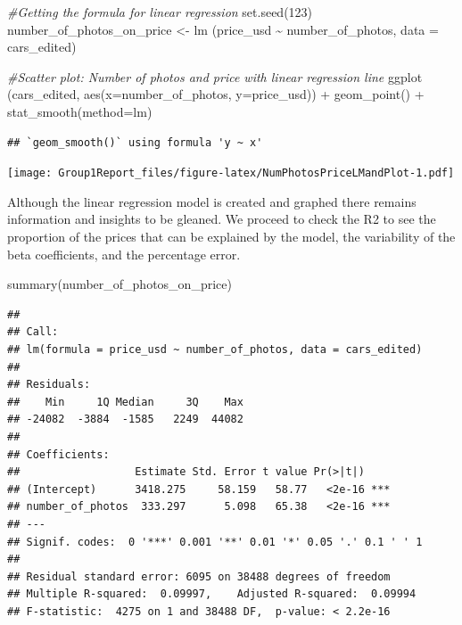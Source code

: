 \documentclass[
]{article}
\newenvironment{Shaded}{\begin{snugshade}}{\end{snugshade}}
\newcommand{\AttributeTok}[1]{\textcolor[rgb]{0.77,0.63,0.00}{#1}}
\newcommand{\CommentTok}[1]{\textcolor[rgb]{0.56,0.35,0.01}{\textit{#1}}}
\newcommand{\DecValTok}[1]{\textcolor[rgb]{0.00,0.00,0.81}{#1}}
\newcommand{\FunctionTok}[1]{\textcolor[rgb]{0.00,0.00,0.00}{#1}}
\newcommand{\NormalTok}[1]{#1}
\newcommand{\OtherTok}[1]{\textcolor[rgb]{0.56,0.35,0.01}{#1}}
\newcommand{\SpecialCharTok}[1]{\textcolor[rgb]{0.00,0.00,0.00}{#1}}
\begin{document}
\begin{Shaded}
\begin{Highlighting}[]
\CommentTok{\#Getting the formula for linear regression}
\FunctionTok{set.seed}\NormalTok{(}\DecValTok{123}\NormalTok{)}
\NormalTok{number\_of\_photos\_on\_price }\OtherTok{\textless{}{-}} \FunctionTok{lm}\NormalTok{ (price\_usd }\SpecialCharTok{\textasciitilde{}}\NormalTok{ number\_of\_photos, }\AttributeTok{data =}\NormalTok{ cars\_edited)}

\CommentTok{\#Scatter plot: Number of photos and price with linear regression line}
\FunctionTok{ggplot}\NormalTok{ (cars\_edited, }\FunctionTok{aes}\NormalTok{(}\AttributeTok{x=}\NormalTok{number\_of\_photos, }\AttributeTok{y=}\NormalTok{price\_usd)) }\SpecialCharTok{+} \FunctionTok{geom\_point}\NormalTok{() }\SpecialCharTok{+} \FunctionTok{stat\_smooth}\NormalTok{(}\AttributeTok{method=}\NormalTok{lm)}
\end{Highlighting}
\end{Shaded}

\begin{verbatim}
## `geom_smooth()` using formula 'y ~ x'
\end{verbatim}

\texttt{[image: Group1Report\_files/figure-latex/NumPhotosPriceLMandPlot-1.pdf]}

Although the linear regression model is created and graphed there
remains information and insights to be gleaned. We proceed to check the
R2 to see the proportion of the prices that can be explained by the
model, the variability of the beta coefficients, and the percentage
error.

\begin{Shaded}
\begin{Highlighting}[]
\FunctionTok{summary}\NormalTok{(number\_of\_photos\_on\_price)}
\end{Highlighting}
\end{Shaded}

\begin{verbatim}
## 
## Call:
## lm(formula = price_usd ~ number_of_photos, data = cars_edited)
## 
## Residuals:
##    Min     1Q Median     3Q    Max 
## -24082  -3884  -1585   2249  44082 
## 
## Coefficients:
##                  Estimate Std. Error t value Pr(>|t|)    
## (Intercept)      3418.275     58.159   58.77   <2e-16 ***
## number_of_photos  333.297      5.098   65.38   <2e-16 ***
## ---
## Signif. codes:  0 '***' 0.001 '**' 0.01 '*' 0.05 '.' 0.1 ' ' 1
## 
## Residual standard error: 6095 on 38488 degrees of freedom
## Multiple R-squared:  0.09997,    Adjusted R-squared:  0.09994 
## F-statistic:  4275 on 1 and 38488 DF,  p-value: < 2.2e-16
\end{verbatim}
\end{document}
